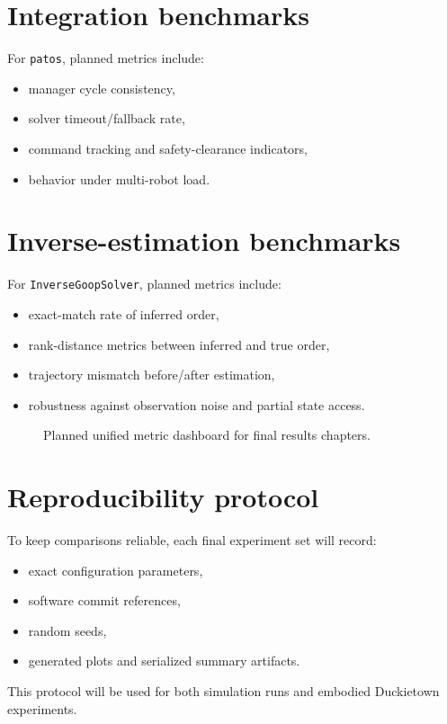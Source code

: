 \section{Integration benchmarks}

For \texttt{patos}, planned metrics include:

\begin{itemize}
    \item manager cycle consistency,
    \item solver timeout/fallback rate,
    \item command tracking and safety-clearance indicators,
    \item behavior under multi-robot load.
\end{itemize}

\section{Inverse-estimation benchmarks}

For \texttt{InverseGoopSolver}, planned metrics include:

\begin{itemize}
    \item exact-match rate of inferred order,
    \item rank-distance metrics between inferred and true order,
    \item trajectory mismatch before/after estimation,
    \item robustness against observation noise and partial state access.
\end{itemize}

\begin{figure}[tbp]
    \centering
    \caption{Planned unified metric dashboard for final results chapters.}
    \label{fig:metric_dashboard}
\end{figure}

\section{Reproducibility protocol}

To keep comparisons reliable, each final experiment set will record:

\begin{itemize}
    \item exact configuration parameters,
    \item software commit references,
    \item random seeds,
    \item generated plots and serialized summary artifacts.
\end{itemize}

This protocol will be used for both simulation runs and embodied Duckietown
experiments.
